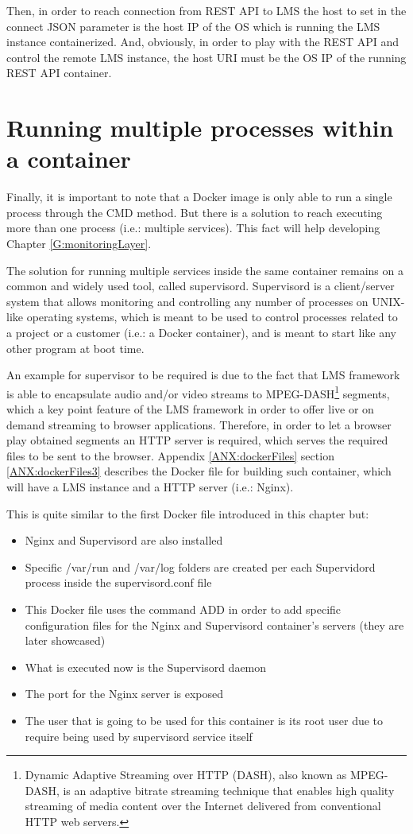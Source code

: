 Then, in order to reach connection from REST API to LMS the host to set in the connect JSON parameter is the host IP of the OS which is running the LMS instance containerized. And, obviously, in order to play with the REST API and control the remote LMS instance, the host URI must be the OS IP of the running REST API container.

\section{Running multiple processes within a container}

Finally, it is important to note that a Docker image is only able to run a single process through the CMD method. But there is a solution to reach executing more than one process (i.e.: multiple services). This fact will help developing Chapter \ref{G:monitoringLayer}.

The solution for running multiple services inside the same container remains on a common and widely used tool, called supervisord. Supervisord is a client/server system that allows monitoring and controlling any number of processes on UNIX-like operating systems, which is meant to be used to control processes related to a project or a customer (i.e.: a Docker container), and is meant to start like any other program at boot time.

An example for supervisor to be required is due to the fact that LMS framework is able to encapsulate audio and/or video streams to MPEG-DASH\footnote{Dynamic Adaptive Streaming over HTTP (DASH), also known as MPEG-DASH, is an adaptive bitrate streaming technique that enables high quality streaming of media content over the Internet delivered from conventional HTTP web servers.} \cite{mpegdash} segments, which a key point feature of the LMS framework in order to offer live or on demand streaming to browser applications. Therefore, in order to let a browser play obtained segments an HTTP server is required, which serves the required files to be sent to the browser. Appendix \ref{ANX:dockerFiles} section \ref{ANX:dockerFiles3} describes the Docker file for building such container, which will have a LMS instance and a HTTP server (i.e.: Nginx).

This is quite similar to the first Docker file introduced in this chapter but:

\begin{itemize}
\item Nginx and Supervisord are also installed
\item Specific /var/run and /var/log folders are created per each Supervidord process inside the supervisord.conf file
\item This Docker file uses the command ADD in order to add specific configuration files for the Nginx and Supervisord container's servers (they are later showcased)
\item What is executed now is the Supervisord daemon
\item The port for the Nginx server is exposed
\item The user that is going to be used for this container is its root user due to require being used by supervisord service itself
\end{itemize}

